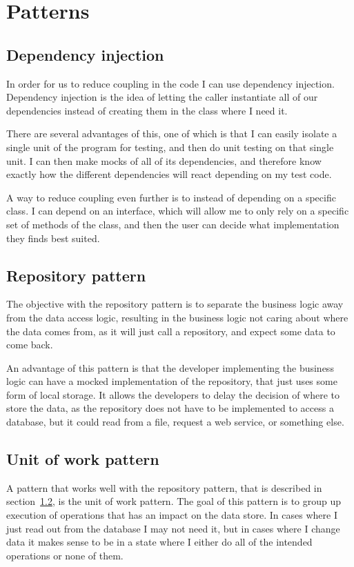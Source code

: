 \section{Patterns}
\label{sec:Patterns}

\subsection{Dependency injection}
\label{sub:Dependency injection}
In order for us to reduce coupling in the code I can use dependency injection.
Dependency injection is the idea of letting the caller instantiate all of our
dependencies instead of creating them in the class where I need it. 

There are several advantages of this, one of which is that I can easily isolate
a single unit of the program for testing, and then do unit testing on that
single unit. I can then make mocks of all of its dependencies, and therefore
know exactly how the different dependencies will react depending on my test
code\cite{dependency_injection}. 

A way to reduce coupling even further is to instead of depending on a specific
class. I can depend on an interface, which will allow me to only rely on a
specific set of methods of the class, and then the user can decide what
implementation they finds best suited. 

\subsection{Repository pattern}
\label{sub:Repository pattern}
The objective with the repository pattern is to separate the business logic away
from the data access logic, resulting in the business logic not caring about
where the data comes from, as it will just call a repository, and expect some
data to come back. 

An advantage of this pattern is that the developer implementing the business
logic can have a mocked implementation of the repository, that just uses some
form of local storage. It allows the developers to delay the decision of where
to store the data, as the repository does not have to be implemented to access a
database, but it could read from a file, request a web service, or something
else\cite{repository_pattern}. 

\subsection{Unit of work pattern}
\label{sub:Unit of work pattern}
A pattern that works well with the repository pattern, that is described in
section~\ref{sub:Repository pattern}, is the unit of work pattern. The goal of
this pattern is to group up execution of operations that has an impact on the
data store. In cases where I just read out from the database I may not need it,
but in cases where I change data it makes sense to be in a state where I either
do all of the intended operations or none of them. 


